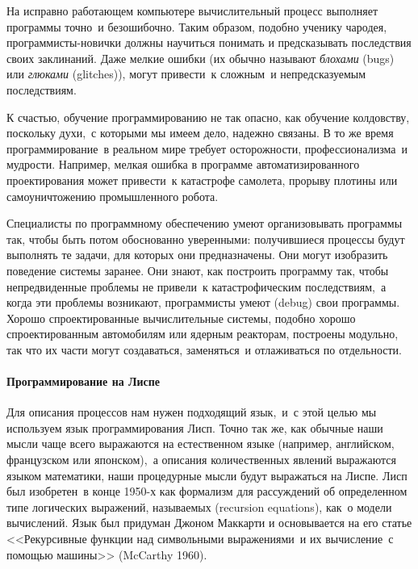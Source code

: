 На исправно работающем компьютере вычислительный процесс
выполняет программы точно~и безошибочно. Таким образом, подобно
ученику чародея, про\-грам\-мис\-ты-но\-вич\-ки должны научиться понимать и
предсказывать последствия своих заклинаний.  Даже мелкие ошибки
(их обычно называют {\em блохами} (bugs)
или {\em глюками} (glitches)), могут привести~к сложным~и 
непредсказуемым последствиям.

К счастью, обучение программированию не так опасно, как
обучение колдовству, поскольку духи,~с которыми мы имеем дело, надежно
связаны.  В то же время программирование~в реальном мире
требует осторожности, профессионализма~и мудрости.  Например, мелкая
ошибка в программе автоматизированного проектирования может привести~к 
катастрофе самолета, прорыву плотины или самоуничтожению промышленного 
робота.

Специалисты по программному обеспечению умеют организовывать
программы так, чтобы быть потом обоснованно уверенными: 
получившиеся процессы будут выполнять те задачи, для которых они
предназначены.  Они могут изобразить поведение системы заранее.  Они
знают, как построить программу так, чтобы непредвиденные проблемы не
привели~к катастрофическим последствиям,~а когда эти проблемы
возникают, программисты умеют (debug) свои
программы.
Хорошо спроектированные вычислительные системы, подобно хорошо
спроектированным автомобилям или ядерным реакторам, построены модульно, 
так что их части могут создаваться, заменяться~и отлаживаться по
отдельности.

\paragraph{Программирование на Лиспе}


Для описания процессов нам нужен подходящий язык,~и~с этой 
целью мы используем язык программирования Лисп.  Точно так же, как
обычные наши мысли чаще всего выражаются на естественном языке
(например, английском, французском или японском),~а описания
количественных явлений выражаются языком математики, наши процедурные
мысли будут выражаться на Лиспе.  Лисп был изобретен~в конце 1950-х как
формализм для рассуждений об определенном типе логических выражений,
называемых  (recursion   equations), как~о модели
вычислений.  Язык был придуман Джоном Маккарти
и основывается на его
статье <<Рекурсивные функции над символьными выражениями~и их
вычисление~с помощью машины>> (McCarthy 1960).

